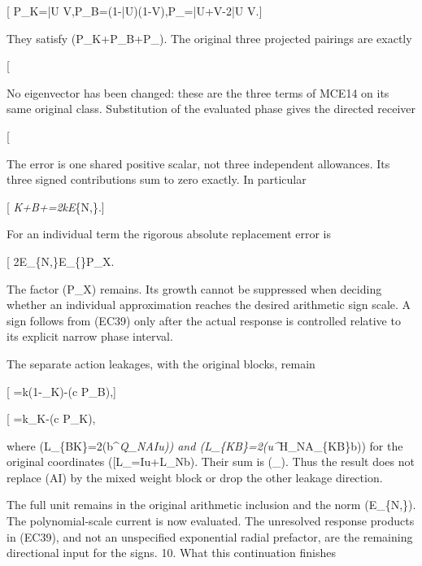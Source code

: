 {[} P\_K=\bar U V,\quad P\_B=(1-\bar U)(1-V),\quad P\_\times=\bar U+V-2\bar U V.{]}

They satisfy (P\_K+P\_B+P\_). The original three projected pairings are exactly

{[}  \tag{EC38}{]}

No eigenvector has been changed: these are the three terms of MCE14 on its same original class. Substitution of the evaluated phase gives the directed receiver

{[}  \tag{EC39}{]}

The error is one shared positive scalar, not three independent allowances. Its three signed contributions sum to zero exactly. In particular

{[} \Phi\emph{K+\Phi\emph{B+\Phi}\times=2k\delta E}\{N,\lambda\}.{]}

For an individual term the rigorous absolute replacement error is

{[} 2E\_\{N,\lambda\}E\_\{\}\textbar{}P\_X\textbar. \tag{EC40}{]}

The factor (\textbar{}P\_X\textbar) remains. Its growth cannot be suppressed when deciding whether an individual approximation reaches the desired arithmetic sign scale. A sign follows from (EC39) only after the actual response is controlled relative to its explicit narrow phase interval.

The separate action leakages, with the original blocks, remain

{[}  =k\delta(1-\theta\_K)-(\mathfrak c P\_B),{]}

{[}  =k\delta\theta\_K-(\mathfrak c P\_K), \tag{EC41}{]}

where (\mathcal L\_\{BK\}=2(b\^{}\emph{Q\_N\Lambda AIu)) and (\mathcal L\_\{KB\}=2(u\^{}}H\_NA\_\{KB\}b)) for the original coordinates ({[}L\_\lambda{]}=Iu+L\_Nb). Their sum is (\Phi\_\times). Thus the result does not replace (\Lambda AI) by the mixed weight block or drop the other leakage direction.

The full unit remains in the original arithmetic inclusion and the norm (E\_\{N,\lambda\}). The polynomial-scale current is now evaluated. The unresolved response products in (EC39), and not an unspecified exponential radial prefactor, are the remaining directional input for the signs. 10. What this continuation finishes


